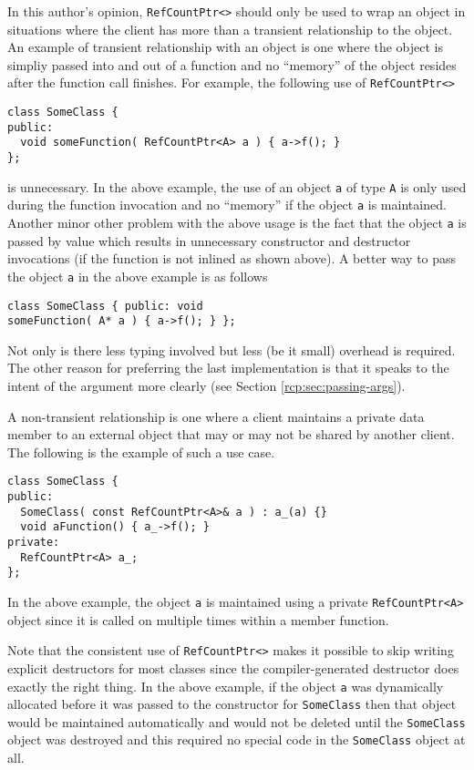 In this author's opinion, {}\texttt{RefCountPtr<>} should only be used
to wrap an object in situations where the client has more than a
transient relationship to the object.  An example of transient
relationship with an object is one where the object is simpliy passed
into and out of a function and no ``memory'' of the object resides
after the function call finishes.  For example, the following use
of {}\texttt{RefCountPtr<>}

{\scriptsize\begin{verbatim}
class SomeClass {
public:
  void someFunction( RefCountPtr<A> a ) { a->f(); }
};
\end{verbatim}}

{}\noindent{}is unnecessary.  In the above example, the use of an
object {}\texttt{a} of type {}\texttt{A} is only used during the
function invocation and no ``memory'' if the object {}\texttt{a} is
maintained.  Another minor other problem with the above usage is the
fact that the object {}\texttt{a} is passed by value which results in
unnecessary constructor and destructor invocations (if the function is
not inlined as shown above).  A better way to pass the object
{}\texttt{a} in the above example is as follows

{\scriptsize\begin{verbatim}
class SomeClass { public: void
someFunction( A* a ) { a->f(); } };
\end{verbatim}}

{}\noindent{}Not only is there less typing involved but less (be it
small) overhead is required.  The other reason for preferring the last
implementation is that it speaks to the intent of the argument more
clearly (see Section {}\ref{rcp:sec:passing-args}).

A non-transient relationship is one where a client maintains a private
data member to an external object that may or may not be shared by
another client.  The following is the example of such a use case.

{\scriptsize\begin{verbatim}
class SomeClass {
public:
  SomeClass( const RefCountPtr<A>& a ) : a_(a) {}
  void aFunction() { a_->f(); }
private:
  RefCountPtr<A> a_;
};
\end{verbatim}}

{}\noindent{} In the above example, the object {}\texttt{a} is
maintained using a private {}\texttt{RefCountPtr<A>} object since it
is called on multiple times within a member function.

Note that the consistent use of {}\texttt{RefCountPtr<>} makes it
possible to skip writing explicit destructors for most classes since
the compiler-generated destructor does exactly the right thing.  In
the above example, if the object {}\texttt{a} was dynamically
allocated before it was passed to the constructor for
{}\texttt{SomeClass} then that object would be maintained
automatically and would not be deleted until the {}\texttt{SomeClass}
object was destroyed and this required no special code in the
{}\texttt{SomeClass} object at all.

